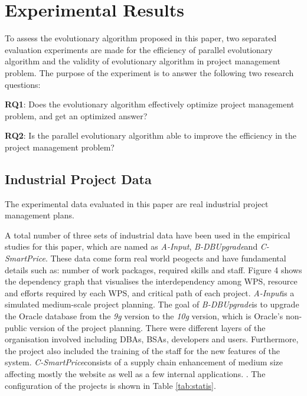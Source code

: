 %
%
\newcommand{\projectA}[0]{\emph{A-Input}}
\newcommand{\projectB}[0]{\emph{B-DBUpgrade}}
\newcommand{\projectC}[0]{\emph{C-SmartPrice}}

\section{Experimental Results}
%
To assess the evolutionary algorithm proposed in this paper, two separated
evaluation experiments are made for the efficiency of parallel evolutionary
algorithm and the validity of evolutionary algorithm in project management
problem. The purpose of the experiment is to answer the following two research
questions:


\textbf{RQ1}: Does the evolutionary algorithm effectively optimize project
management problem, and get an optimized answer?

\textbf{RQ2}: Is the parallel evolutionary algorithm able to improve the
efficiency in the project management problem?


\subsection{Industrial Project Data}
%
The experimental data evaluated in this paper are real industrial project
management plans.


A total number of three sets of industrial data have been used in the empirical
studies for this paper, which are named as \projectA, \projectB and
\projectC. These data come form real world peogects and have fundamental details
such as: number of work packages, required skills and staff.  Figure 4 shows the
dependency graph that visualises the interdependency among WPS, resource and
efforts required by each WPS, and critical path of each project. \projectA is a
simulated medium-scale project planning. The goal of \projectB is to upgrade the
Oracle database from the \emph{9g} version to the \emph{10g} version, which is
Oracle's non-public version of the project planning. There were different layers
of the organisation involved including DBAs, BSAs, developers and users.
Furthermore, the project also included the training of the staff for the new
features of the system.  \projectC consists of a supply chain enhancement of
medium size affecting mostly the website as well as a few internal
applications. \cite{ren}.  The configuration of the projects is shown in Table
\ref{tab:statis}.

